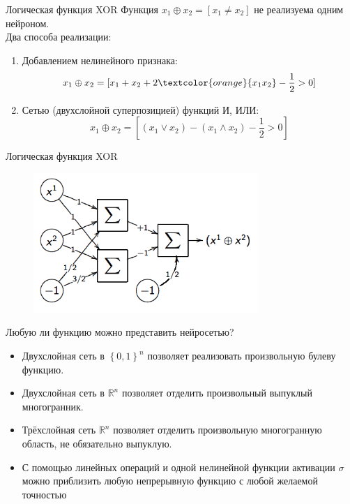 \documentclass[10pt]{beamer}
\begin{document}
\begin{frame}{Логическая функция XOR}
	Функция $x_1 \oplus x_2 = [x_1 \neq x_2]$ не реализуема одним нейроном.\\
	\bigbreak
	\pause
	Два способа реализации:\\
	\begin{enumerate}[<+->]
		\item Добавлением нелинейного признака:\\
		$$x_1 \oplus x_2 = [x_1 + x_2 + 2 \textcolor{orange}{x_1x_2} - \frac{1}{2} > 0]$$
		\item Сетью (двухслойной суперпозицией) функций И, ИЛИ:\\
		$$x_1 \oplus x_2 = [(x_1 \vee x_2) - (x_1 \wedge x_2) - \frac{1}{2} > 0]$$
		\end{enumerate}
\end{frame}

\begin{frame}{Логическая функция XOR}
	\begin{figure}[htbp]
	  \includegraphics[height=150pt, keepaspectratio = true]{images/XOR1}   
	\end{figure}
\end{frame}

\begin{frame}{Любую ли функцию можно представить нейросетью?}
	\begin{itemize}[<+->]
		\item Двухслойная сеть в $\left\{0, 1 \right\}^n$ позволяет реализовать произвольную булеву функцию.
		\item Двухслойная сеть в $\mathbb{R}^n$ позволяет отделить произвольный выпуклый многогранник.
		\item Трёхслойная сеть $\mathbb{R}^n$ позволяет отделить произвольную многогранную область, не обязательно выпуклую.
		\item С помощью линейных операций и одной нелинейной функции активации $\sigma$ можно приблизить любую непрерывную функцию с любой желаемой точностью
	\end{itemize}
\end{frame}
\end{document}
